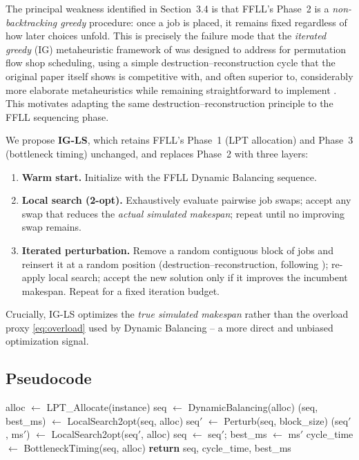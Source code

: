 \documentclass[11pt,a4paper]{article}
\begin{document}
The principal weakness identified in Section~3.4 is that FFLL's Phase~2
is a \emph{non-backtracking greedy} procedure: once a job is placed,
it remains fixed regardless of how later choices unfold. This is precisely
the failure mode that the \emph{iterated greedy} (IG) metaheuristic
framework of \citet{ruiz2007simple} was designed to address for
permutation flow shop scheduling, using a simple destruction--reconstruction
cycle that the original paper itself shows is competitive with, and often
superior to, considerably more elaborate metaheuristics while remaining
straightforward to implement \citep{ruiz2007simple}. This motivates
adapting the same destruction--reconstruction principle to the FFLL
sequencing phase.

We propose \textbf{IG-LS}, which retains FFLL's Phase~1 (LPT allocation)
and Phase~3 (bottleneck timing) unchanged, and replaces Phase~2 with three
layers:

\begin{enumerate}
  \item \textbf{Warm start.} Initialize with the FFLL Dynamic Balancing
    sequence.
  \item \textbf{Local search (2-opt).} Exhaustively evaluate pairwise job
    swaps; accept any swap that reduces the \emph{actual simulated
    makespan}; repeat until no improving swap remains.
  \item \textbf{Iterated perturbation.} Remove a random contiguous block of
    jobs and reinsert it at a random position (destruction--reconstruction,
    following \citet{ruiz2007simple}); re-apply local search; accept the
    new solution only if it improves the incumbent makespan. Repeat for a
    fixed iteration budget.
\end{enumerate}

Crucially, IG-LS optimizes the \emph{true simulated makespan} rather than
the overload proxy \eqref{eq:overload} used by Dynamic Balancing -- a
more direct and unbiased optimization signal.

\subsection{Pseudocode}

\begin{algorithm}[h!]
\caption{IG-LS: Iterated Greedy with Local Search}
\begin{algorithmic}[1]
  \State alloc $\gets$ LPT\_Allocate(instance) 
  \State seq $\gets$ DynamicBalancing(alloc) 
  \State (seq, best\_ms) $\gets$ LocalSearch2opt(seq, alloc)
    \State seq$'$ $\gets$ Perturb(seq, block\_size) 
    \State (seq$'$, ms$'$) $\gets$ LocalSearch2opt(seq$'$, alloc)
      \State seq $\gets$ seq$'$; \quad best\_ms $\gets$ ms$'$
    \EndIf
  \EndFor
  \State cycle\_time $\gets$ BottleneckTiming(seq, alloc) 
  \State \textbf{return} seq, cycle\_time, best\_ms
\EndProcedure
\end{algorithmic}
\end{algorithm}
\end{document}
